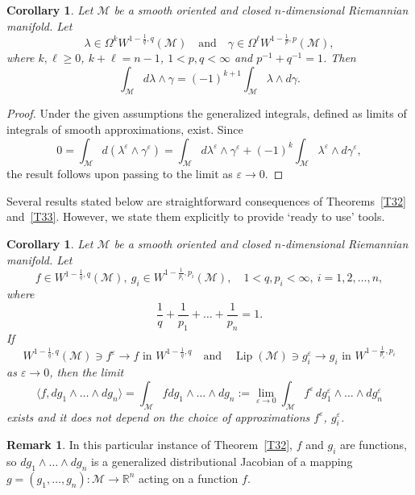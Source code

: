 \documentclass[intlimits,12pt,reqno]{amsart}
\newcommand{\cM}{\mathcal M}
\newcommand{\R}{\mathbb R}
\newcommand{\eps}{\varepsilon}
\numberwithin{equation}{section}
\def\lip{\operatorname{Lip}}
\newtheorem{corollary}[theorem]{Corollary}
\theoremstyle{definition}
\newtheorem{remark}[theorem]{Remark}
\begin{document}
\begin{corollary}
\label{T51}
Let $\cM$ be a smooth oriented and closed $n$-dimensional Riemannian manifold. Let
$$
\lambda\in \Omega^k W^{1-\frac{1}{q},q}\left(\cM\right)
\quad
\text{and}
\quad
\gamma\in \Omega^\ell W^{1-\frac{1}{p},p}\left(\cM\right),
$$
where $k,\ell\geq 0$, $k+\ell=n-1$, $1<p,q<\infty$ and $p^{-1}+q^{-1}=1$. Then
$$
\int_{\cM}d\lambda\wedge\gamma=(-1)^{k+1}\int_{\cM}\lambda\wedge d\gamma.
$$
\end{corollary}
\begin{proof}
Under the given assumptions the generalized integrals, defined as limits of integrals of smooth approximations, exist. Since
$$
0=\int_{\cM}d(\lambda^\eps\wedge\gamma^\eps)=\int_{\cM} d\lambda^\eps\wedge\gamma^\eps+
(-1)^k\int_{\cM}\lambda^\eps\wedge d\gamma^\eps,
$$
the result follows upon passing to the limit as $\eps\to 0$.
\end{proof}
Several results stated below are straightforward consequences of Theorems~\ref{T32} and~\ref{T33}. However, we state them explicitly to provide `ready to use' tools.  
\begin{corollary}
\label{T11}
Let $\cM$ be a smooth oriented and closed $n$-dimensional Riemannian manifold. Let
$$
f\in W^{1-\frac{1}{q},q}(\cM),\ g_i\in W^{1-\frac{1}{p_i},p_i}(\cM),
\quad
1<q,p_i<\infty,\ i=1,2,\ldots,n,
$$
where
\begin{equation}
\label{eq201}
\frac{1}{q}+\frac{1}{p_1}+\ldots+\frac{1}{p_n}=1.
\end{equation}
If
$$
\text{$W^{1-\frac{1}{q},q}(\cM)\ni f^\eps\to f$ in $W^{1-\frac{1}{q},q}$}
\quad
\text{and}
\quad
\text{$\lip(\cM)\ni g_i^\eps\to g_i$ in $W^{1-\frac{1}{p_i},p_i}$}
$$
as $\eps\to 0$, then the limit
$$
\langle f,dg_1\wedge\ldots\wedge dg_n\rangle= \int_{\cM} f dg_1\wedge\ldots\wedge dg_n:=\lim_{\eps\to 0} \int_{\cM}f^\eps\, dg_1^\eps\wedge\ldots\wedge dg_n^\eps
$$
exists and it does not depend on the choice of  approximations $f^\eps$, $g_i^\eps$.
\end{corollary}
\begin{remark}
In this particular instance of Theorem~\ref{T32}, $f$ and $g_i$ are functions, so $dg_1\wedge\ldots\wedge dg_n$ is a generalized distributional Jacobian of a mapping $g=(g_1,\ldots,g_n):\cM\to\R^n$ acting on a function $f$.
\end{remark}
\end{document}
